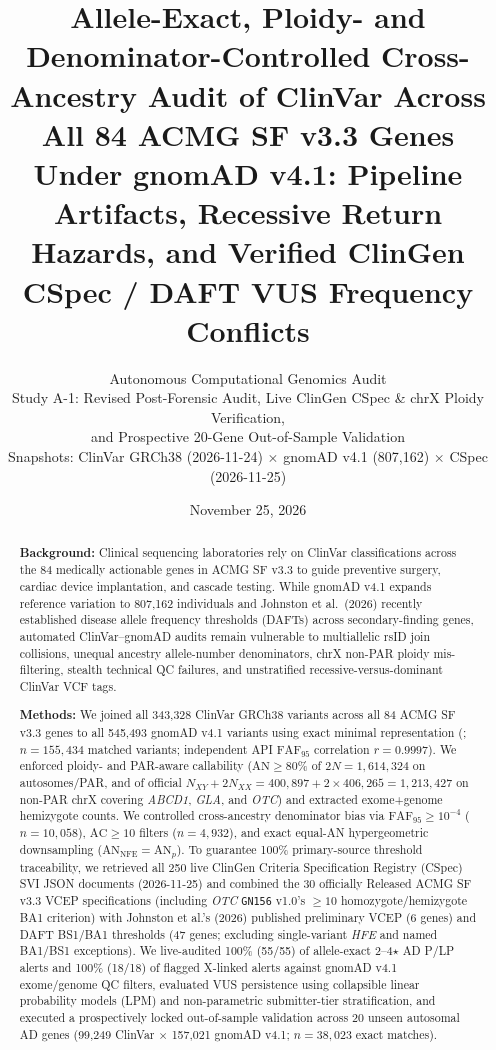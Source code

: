 \documentclass[11pt,letterpaper]{article}
\title{\textbf{Allele-Exact, Ploidy- and Denominator-Controlled Cross-Ancestry Audit of ClinVar Across All 84 ACMG SF v3.3 Genes Under gnomAD v4.1: Pipeline Artifacts, Recessive Return Hazards, and Verified ClinGen CSpec / DAFT VUS Frequency Conflicts}}
\author{Autonomous Computational Genomics Audit\\
\small Study A-1: Revised Post-Forensic Audit, Live ClinGen CSpec \& chrX Ploidy Verification,\\
\small and Prospective 20-Gene Out-of-Sample Validation\\
\small Snapshots: ClinVar GRCh38 (2026-11-24) $\times$ gnomAD v4.1 (807,162) $\times$ CSpec (2026-11-25)}
\date{November 25, 2026}
\begin{document}
\maketitle

\begin{abstract}
\noindent\textbf{Background:} Clinical sequencing laboratories rely on ClinVar classifications across the 84 medically actionable genes in ACMG SF v3.3 to guide preventive surgery, cardiac device implantation, and cascade testing. While gnomAD v4.1 expands reference variation to 807,162 individuals and Johnston et al.\ (2026) recently established disease allele frequency thresholds (DAFTs) across secondary-finding genes, automated ClinVar--gnomAD audits remain vulnerable to multiallelic rsID join collisions, unequal ancestry allele-number denominators, chrX non-PAR ploidy mis-filtering, stealth technical QC failures, and unstratified recessive-versus-dominant ClinVar VCF tags.

\noindent\textbf{Methods:} We joined all 343,328 ClinVar GRCh38 variants across all 84 ACMG SF v3.3 genes to all 545,493 gnomAD v4.1 variants using exact minimal representation (; $n=155,434$ matched variants; independent API $\mathrm{FAF}_{95}$ correlation $r=0.9997$). We enforced ploidy- and PAR-aware callability ($\mathrm{AN}\ge 80\%$ of $2N=1,614,324$ on autosomes/PAR, and of official $N_{XY}+2N_{XX}=400,897+2\times 406,265=1,213,427$ on non-PAR chrX covering \textit{ABCD1}, \textit{GLA}, and \textit{OTC}) and extracted exome+genome hemizygote counts. We controlled cross-ancestry denominator bias via $\mathrm{FAF}_{95}\ge 10^{-4}$ ($n=10,058$), $\mathrm{AC}\ge 10$ filters ($n=4,932$), and exact equal-AN hypergeometric downsampling ($\mathrm{AN}_{\mathrm{NFE}}=\mathrm{AN}_p$). To guarantee 100\% primary-source threshold traceability, we retrieved all 250 live ClinGen Criteria Specification Registry (CSpec) SVI JSON documents (2026-11-25) and combined the 30 officially Released ACMG SF v3.3 VCEP specifications (including \textit{OTC} \texttt{GN156} v1.0's $\ge 10$ homozygote/hemizygote BA1 criterion) with Johnston et al.'s (2026) published preliminary VCEP (6 genes) and DAFT BS1/BA1 thresholds (47 genes; excluding single-variant \textit{HFE} and named BA1/BS1 exceptions). We live-audited 100\% (55/55) of allele-exact 2--4$\star$ AD P/LP alerts and 100\% (18/18) of flagged X-linked alerts against gnomAD v4.1 exome/genome QC filters, evaluated VUS persistence using collapsible linear probability models (LPM) and non-parametric submitter-tier stratification, and executed a prospectively locked out-of-sample validation across 20 unseen autosomal AD genes (99,249 ClinVar $\times$ 157,021 gnomAD v4.1; $n=38,023$ exact matches).


\end{abstract}
\end{document}
